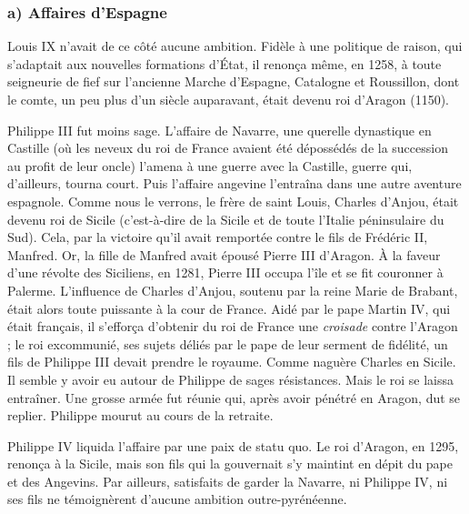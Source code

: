 \documentclass[french,twoside]{book} %
\begin{document}
\subsubsection[a) Affaires d’Espagne]{a) Affaires d’Espagne}
\noindent Louis IX n’avait de ce côté aucune ambition. Fidèle à une politique de raison, qui s’adaptait aux nouvelles formations d’État, il renonça même, en 1258, à toute seigneurie de fief sur l’ancienne Marche d’Espagne, Catalogne et Roussillon, dont le comte, un peu plus d’un siècle auparavant, était devenu roi d’Aragon (1150).\par
Philippe III fut moins sage. L’affaire de Navarre, une querelle dynastique en Castille (où les neveux du roi de France avaient été dépossédés de la succession au profit de leur oncle) l’amena à une guerre avec la Castille, guerre qui, d’ailleurs, tourna court. Puis l’affaire angevine l’entraîna dans une autre aventure espagnole. Comme nous le verrons, le frère de saint Louis, Charles d’Anjou, était devenu roi de Sicile (c’est-à-dire de la Sicile et de toute l’Italie péninsulaire du Sud). Cela, par la victoire qu’il avait remportée contre le fils de Frédéric II, Manfred. Or, la fille de Manfred avait épousé Pierre III d’Aragon. À la faveur d’une révolte des Siciliens, en 1281, Pierre III occupa l’île et se fit couronner à Palerme. L’influence de Charles d’Anjou, soutenu par la reine Marie de Brabant, était alors toute puissante à la cour de France. Aidé par le pape Martin IV, qui était français, il s’efforça d’obtenir du roi de France une \emph{croisade} contre l’Aragon ; le roi excommunié, ses sujets déliés par le pape de leur serment de fidélité, un fils de Philippe III devait prendre le royaume. Comme naguère Charles en Sicile. Il semble y avoir eu autour de Philippe de sages résistances. Mais le roi se laissa entraîner. Une grosse armée fut réunie qui, après avoir pénétré en Aragon, dut se replier. Philippe mourut au cours de la retraite.\par
Philippe IV liquida l’affaire par une paix de statu quo. Le roi d’Aragon, en 1295, renonça à la Sicile, mais son fils qui la gouvernait s’y maintint en dépit du pape et des Angevins. Par ailleurs, satisfaits de garder la Navarre, ni Philippe IV, ni ses fils ne témoignèrent d’aucune ambition outre-pyrénéenne.
\end{document}
